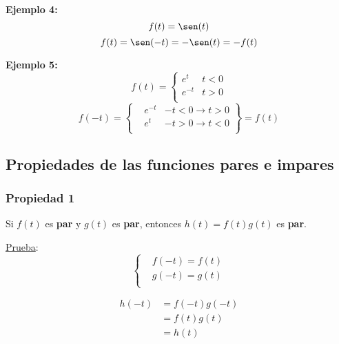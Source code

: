 \textbf{Ejemplo 4:}
\begin{equation*}
    f(t)=\sen(t)
\end{equation*}
\begin{equation*}
    f(t)=\sen(-t)=-\sen(t)=-f(t)
\end{equation*}

\textbf{Ejemplo 5:}
\begin{equation*}
    f(t)=\begin{cases}
        e^t &t<0\\
        e^{-t} &t>0\\
    \end{cases}
\end{equation*}
\begin{equation*}
    f(-t)=\left\{\!\begin{aligned}
    &e^{-t} &-t<0 \rightarrow t>0\\
    &e^{t}  &-t>0 \rightarrow t<0\\
    \end{aligned}\right\}
    =f(t)
\end{equation*}

\begin{figure}[H]
    \centering
    
\end{figure}

\subsection{Propiedades de las funciones pares e impares}

\subsubsection*{Propiedad 1}
Si $f(t)$ es \textbf{par} y $g(t)$ es \textbf{par}, entonces $h(t)=f(t)g(t)$ es
\textbf{par}.

\underline{Prueba}:
\begin{equation*}
\begin{cases}
    &f(-t)=f(t)\\
    &g(-t)=g(t)\\
\end{cases}
\end{equation*}

\begin{equation*}
\begin{split}
    h(-t)
        &=f(-t)g(-t)\\
        &=f(t)g(t)\\
        &=h(t)\\
\end{split}
\end{equation*}

